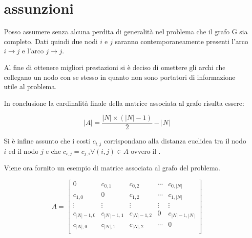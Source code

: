 %
%
\section[Assunzioni]{assunzioni}
\label{pt1:assumption}
Posso assumere senza alcuna perdita di generalità nel problema che il grafo G sia completo. Dati quindi due nodi $i$ e $j$ saranno contemporaneamente presenti l'arco $i \rightarrow j$ e l'arco $j \rightarrow j$.

Al fine di ottenere migliori prestazioni si è deciso di omettere gli archi che collegano un nodo con se stesso in quanto non sono portatori di informazione utile al problema.

In conclusione la cardinalità finale della matrice associata al grafo risulta essere:

\begin{equation}
\left|A\right| = \frac{\left|N\right|\times\left(\left|N\right|-1\right)}{2} - \left|N\right|
\end{equation}

Si è infine assunto che i costi $c_{i,j}$ corrispondano alla distanza euclidea tra il nodo $i$ ed il nodo $j$ e che $c_{i,j}=c_{j,i} \forall (i,j)\in A$ ovvero il .

Viene ora fornito un esempio di matrice associata al grafo del problema.

\begin{equation}
A=
\begin{bmatrix} 
0                        & c_{0,1}                  & c_{0,2}                  & \cdots & c_{0,\left|N\right|}                  \\
c_{1,0}                  & 0                        & c_{1,2}                  & \cdots & c_{1,\left|N\right|}                  \\
\vdots                   & \vdots                   & \vdots                   & \vdots & \vdots                                \\
c_{\left|N\right| - 1,0} & c_{\left|N\right| - 1,1} & c_{\left|N\right| - 1,2} & 0      & c_{\left|N\right| - 1,\left|N\right|} \\
c_{\left|N\right|,0}     & c_{\left|N\right|,1}     & c_{\left|N\right|,2}     & \cdots & 0                                     \\
\end{bmatrix}
\end{equation}
